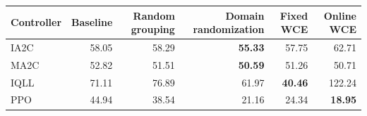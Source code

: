 \begin{tabular}{lrrrrr}
\hline
Controller & Baseline & Random grouping & Domain randomization & Fixed WCE & Online WCE \\
\hline
IA2C & 58.05 & 58.29 & \textbf{55.33} & 57.75 & 62.71 \\
MA2C & 52.82 & 51.51 & \textbf{50.59} & 51.26 & 50.71 \\
IQLL & 71.11 & 76.89 & 61.97 & \textbf{40.46} & 122.24 \\
PPO & 44.94 & 38.54 & 21.16 & 24.34 & \textbf{18.95} \\
\hline
\end{tabular}
